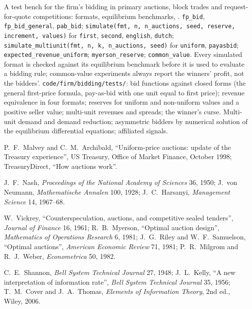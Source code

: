\begin{build}
 A test bench for the firm's bidding in primary auctions, block trades and request-for-quote competitions: formats, equilibrium benchmarks, .
 \texttt{fp\_bid}, \texttt{fp\_bid\_general}, \texttt{pab\_bid}; \texttt{simulate(fmt, n, n\_auctions, seed, reserve, increment, values)} for \texttt{first}, \texttt{second},
\texttt{english}, \texttt{dutch}; \texttt{simulate\_multiunit(fmt, n, k, n\_auctions, seed)} for \texttt{uniform}, \texttt{payasbid}; \texttt{expected\_revenue\_uniform}; \texttt{myerson\_reserve}; \texttt{common\_value}.
 Every simulated format is checked against its equilibrium benchmark before it is used to evaluate a bidding rule; common-value experiments always report the winners' profit, not the bidders'.
 \texttt{code/firm/bidding/tests/}: bid functions against closed forms (the general first-price formula, pay-as-bid with one unit equal to first price); revenue equivalence in four
formats; reserves for uniform and non-uniform values and a positive seller value; multi-unit revenues and spreads; the winner's curse.
 Multi-unit demand and demand reduction; asymmetric bidders by numerical solution of the equilibrium differential equations; affiliated signals.
\end{build}

\begin{omsources}
\item P.~F.~Malvey and C.~M.~Archibald, ``Uniform-price auctions: update of the Treasury experience'', US Treasury, Office of Market Finance, October 1998; TreasuryDirect, ``How auctions work''.
\item J.~F.~Nash, \emph{Proceedings of the National Academy of Sciences} 36, 1950; J.~von Neumann, \emph{Mathematische Annalen} 100, 1928; J.~C.~Harsanyi, \emph{Management Science} 14, 1967--68.
\item W.~Vickrey, ``Counterspeculation, auctions, and competitive sealed tenders'', \emph{Journal of Finance} 16, 1961; R.~B.~Myerson, ``Optimal auction design'', \emph{Mathematics of Operations Research} 6,
1981; J.~G.~Riley and W.~F.~Samuelson, ``Optimal auctions'', \emph{American Economic Review} 71, 1981; P.~R.~Milgrom and R.~J.~Weber, \emph{Econometrica} 50, 1982.
\item C.~E.~Shannon, \emph{Bell System Technical Journal} 27, 1948; J.~L.~Kelly, ``A new interpretation of information rate'', \emph{Bell System Technical Journal} 35, 1956; T.~M.~Cover and J.~A.~Thomas,
\emph{Elements of Information Theory}, 2nd ed., Wiley, 2006.
\end{omsources}

